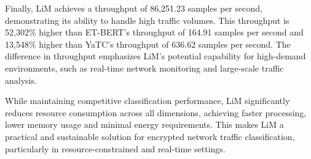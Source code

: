 Finally, LiM achieves a throughput of 86,251.23 samples per second, demonstrating its ability to handle high traffic volumes. This throughput is 52,302\% higher than ET-BERT’s throughput of 164.91 samples per second and 13,548\% higher than YaTC’s throughput of 636.62 samples per second. The difference in throughput emphasizes LiM’s potential capability for high-demand environments, such as real-time network monitoring and large-scale traffic analysis.

While maintaining competitive classification performance, LiM significantly reduces resource consumption across all dimensions, achieving faster processing, lower memory usage and minimal energy requirements. This makes LiM a practical and sustainable solution for encrypted network traffic classification, particularly in resource-constrained and real-time settings.